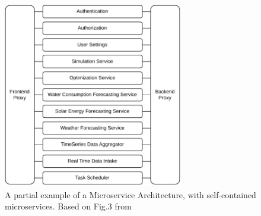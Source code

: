 \begin{figure}[!htbp]
    \centering
    \includegraphics[width=0.70\textwidth]{img/diagrams/pdf/microservice-arch.drawio.pdf}
    \caption[Example Microservice Architecture]{A partial example of a Microservice Architecture, with self-contained microservices. Based on Fig.3 from \parencite{newman_2015}}
    \label{fig:microservice-arch}
\end{figure}
